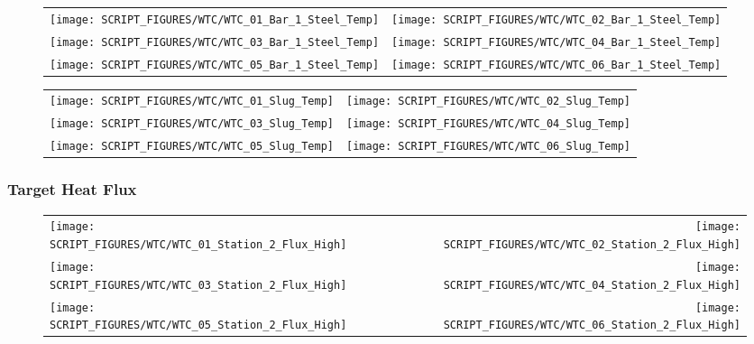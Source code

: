 \begin{figure}[!ht]
\begin{tabular*}{\textwidth}{l@{\extracolsep{\fill}}r}
\texttt{[image: SCRIPT\_FIGURES/WTC/WTC\_01\_Bar\_1\_Steel\_Temp]} &
\texttt{[image: SCRIPT\_FIGURES/WTC/WTC\_02\_Bar\_1\_Steel\_Temp]} \\
\texttt{[image: SCRIPT\_FIGURES/WTC/WTC\_03\_Bar\_1\_Steel\_Temp]} &
\texttt{[image: SCRIPT\_FIGURES/WTC/WTC\_04\_Bar\_1\_Steel\_Temp]} \\
\texttt{[image: SCRIPT\_FIGURES/WTC/WTC\_05\_Bar\_1\_Steel\_Temp]} &
\texttt{[image: SCRIPT\_FIGURES/WTC/WTC\_06\_Bar\_1\_Steel\_Temp]}
\end{tabular*}
\label{NIST_WTC_Bar_1_Steel_Temp}
\end{figure}


\begin{figure}[!ht]
\begin{tabular*}{\textwidth}{l@{\extracolsep{\fill}}r}
\texttt{[image: SCRIPT\_FIGURES/WTC/WTC\_01\_Slug\_Temp]} &
\texttt{[image: SCRIPT\_FIGURES/WTC/WTC\_02\_Slug\_Temp]} \\
\texttt{[image: SCRIPT\_FIGURES/WTC/WTC\_03\_Slug\_Temp]} &
\texttt{[image: SCRIPT\_FIGURES/WTC/WTC\_04\_Slug\_Temp]} \\
\texttt{[image: SCRIPT\_FIGURES/WTC/WTC\_05\_Slug\_Temp]} &
\texttt{[image: SCRIPT\_FIGURES/WTC/WTC\_06\_Slug\_Temp]}
\end{tabular*}
\label{NIST_WTC_Slug_Temp}
\end{figure}

\clearpage

\subsubsection{Target Heat Flux}

\begin{figure}[!ht]
\begin{tabular*}{\textwidth}{l@{\extracolsep{\fill}}r}
\texttt{[image: SCRIPT\_FIGURES/WTC/WTC\_01\_Station\_2\_Flux\_High]} &
\texttt{[image: SCRIPT\_FIGURES/WTC/WTC\_02\_Station\_2\_Flux\_High]} \\
\texttt{[image: SCRIPT\_FIGURES/WTC/WTC\_03\_Station\_2\_Flux\_High]} &
\texttt{[image: SCRIPT\_FIGURES/WTC/WTC\_04\_Station\_2\_Flux\_High]} \\
\texttt{[image: SCRIPT\_FIGURES/WTC/WTC\_05\_Station\_2\_Flux\_High]} &
\texttt{[image: SCRIPT\_FIGURES/WTC/WTC\_06\_Station\_2\_Flux\_High]}
\end{tabular*}
\label{NIST_WTC_Station_2_Flux_High}
\end{figure}

